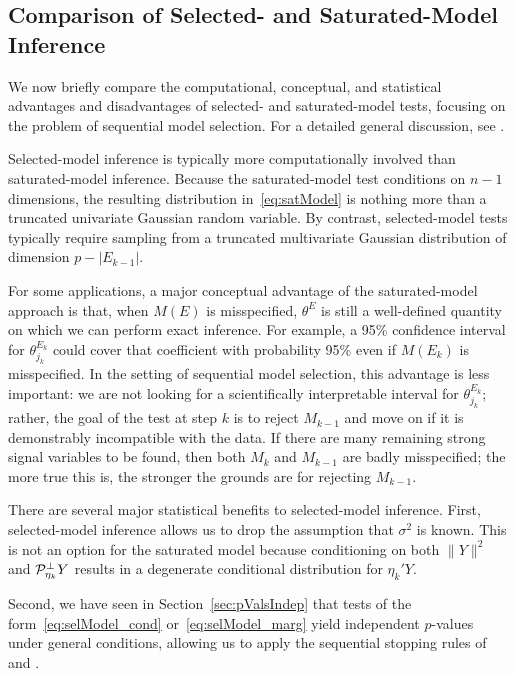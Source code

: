 \documentclass{article}
\begin{document}
\subsection{Comparison of Selected- and Saturated-Model Inference}\label{sec:bivariate}

We now briefly compare the computational, conceptual, and statistical advantages and disadvantages of selected- and saturated-model tests, focusing on the problem of sequential model selection. For a detailed general discussion, see \citet[][Section 5]{fithian2014optimal}.

Selected-model inference is typically more computationally involved than saturated-model inference. Because the saturated-model test conditions on $n-1$ dimensions, the resulting distribution in~\eqref{eq:satModel} is nothing more than a truncated univariate Gaussian random variable. By contrast, selected-model tests typically require sampling from a truncated multivariate Gaussian distribution of dimension $p-|E_{k-1}|$.

For some applications, a major conceptual advantage of the saturated-model approach is that, when $M(E)$ is misspecified, $\theta^{E}$ is still a well-defined quantity on which we can perform exact inference. For example, a 95\% confidence interval for $\theta_{j_k}^{E_k}$ could cover that coefficient with probability 95\% even if $M(E_k)$ is misspecified. In the setting of sequential model selection, this advantage is less important: we are not looking for a scientifically interpretable interval for $\theta_{j_k}^{E_k}$; rather, the goal of the test at step $k$ is to reject $M_{k-1}$ and move on if it is demonstrably incompatible with the data. If there are many remaining strong signal variables to be found, then both $M_k$ and $M_{k-1}$ are badly misspecified; the more true this is, the stronger the grounds are for rejecting $M_{k-1}$.

There are several major statistical benefits to selected-model inference. First, selected-model inference allows us to drop the assumption that $\sigma^2$ is known. This is not an option for the saturated model because conditioning on both $\|Y\|^2$ and $\mathcal{P}_{\eta_k}^\perp Y$ results in a degenerate conditional distribution for $\eta_k'Y$.

Second, we have seen in Section~\ref{sec:pValsIndep} that tests of the form~\eqref{eq:selModel_cond} or~\eqref{eq:selModel_marg} yield independent $p$-values under general conditions, allowing us to apply  the sequential stopping rules of~\citet{gsell2013sequential} and \citet{li2015accumulation}.
\end{document}
